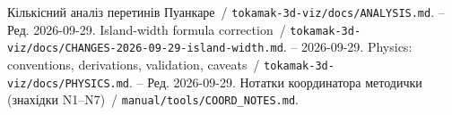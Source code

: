  Кількісний аналіз перетинів Пуанкаре~/ \texttt{tokamak-3d-viz/docs/ANALYSIS.md}. -- Ред. 2026-09-29.
 Island-width formula correction~/ \texttt{tokamak-3d-viz/docs/CHANGES-2026-09-29-island-width.md}. -- 2026-09-29.
 Physics: conventions, derivations, validation, caveats~/ \texttt{tokamak-3d-viz/docs/PHYSICS.md}. -- Ред. 2026-09-29.
 Нотатки координатора методички (знахідки N1--N7)~/ \texttt{manual/tools/COORD\_NOTES.md}.
